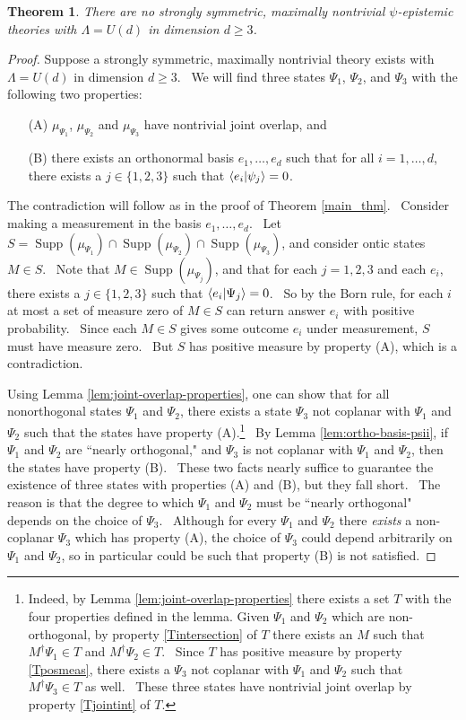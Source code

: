 \documentclass[letterpaper,11pt]{article}
\newtheorem{thm}{Theorem}
\newcommand{\braket}[2]{\mbox{$ \langle #1 | #2 \rangle $}}
\DeclareMathOperator{\supp}{Supp}
\begin{document}
\begin{thm}
\label{main_thm_unitary}
There are no strongly symmetric, maximally nontrivial $\psi$-epistemic theories with $\Lambda= U(d)$ in dimension $d\geq 3$.
\end{thm}
\begin{proof}


Suppose a strongly symmetric, maximally nontrivial theory exists with $\Lambda= U(d)$ in dimension $d\geq 3$. \ We will find three states $\Psi_1$, $\Psi_2$, and $\Psi_3$ with the following two properties:

\begin{enumerate}
\item[(A)] $\mu_{\Psi_1}$, $\mu_{\Psi_2}$ and $\mu_{\Psi_3}$ have nontrivial joint overlap, and
\item[(B)] there exists an orthonormal basis $e_1, \ldots, e_d$ such that for all $i=1,\ldots, d$, there exists a $j \in \{1,2,3\}$ such that $\braket{e_i}{\psi_j}=0$.
\end{enumerate}

The contradiction will follow as in the proof of Theorem \ref{main_thm}. \ Consider making a measurement in the basis $e_1, \ldots, e_d$. \ Let $S=\supp(\mu_{\Psi_1}) \cap \supp(\mu_{\Psi_2}) \cap \supp(\mu_{\Psi_3})$, and consider ontic states $M\in S$. \ Note that $M\in \supp(\mu_{\Psi_j})$, and that for each $j=1,2,3$ and each $e_i$, there exists a $j \in \{1,2,3\}$ such that $\braket{e_i}{\Psi_j}=0$. \ So by the Born rule, for each $i$ at most a set of measure zero of $M\in S$ can return answer $e_i$ with positive probability. \ Since each $M\in S$ gives some outcome $e_i$ under measurement, $S$ must have measure zero. \ But $S$ has positive measure by property (A), which is a contradiction.

Using Lemma \ref{lem:joint-overlap-properties}, one can show that for all nonorthogonal states $\Psi_1$ and $\Psi_2$, there exists a state $\Psi_3$ not coplanar with $\Psi_1$ and $\Psi_2$ such that the states have property (A).\footnote{Indeed, by Lemma \ref{lem:joint-overlap-properties} there exists a set $T$ with the four properties defined in the lemma. Given $\Psi_1$ and $\Psi_2$ which are non-orthogonal, by property \ref{Tintersection} of $T$ there exists an $M$ such that $M^\dagger \Psi_1 \in T$ and $M^\dagger \Psi_2 \in T$. \ Since $T$ has positive measure by property \ref{Tposmeas}, there exists a $\Psi_3$ not coplanar with $\Psi_1$ and $\Psi_2$ such that $M^\dagger \Psi_3 \in T$ as well. \ These three states have nontrivial joint overlap by property \ref{Tjointint} of $T$.} \ By Lemma \ref{lem:ortho-basis-psii}, if $\Psi_1$ and $\Psi_2$ are ``nearly orthogonal," and $\Psi_3$ is not coplanar with $\Psi_1$ and $\Psi_2$, then the states have property (B). \ These two facts nearly suffice to guarantee the existence of three states with properties (A) and (B), but they fall short. \ The reason is that the degree to which $\Psi_1$ and $\Psi_2$ must be ``nearly orthogonal" depends on the choice of $\Psi_3$. \ Although for every $\Psi_1$ and $\Psi_2$ there \emph{exists} a non-coplanar $\Psi_3$ which has property (A), the choice of $\Psi_3$ could depend arbitrarily on $\Psi_1$ and $\Psi_2$, so in particular could be such that property (B) is not satisfied.


\end{proof}
\end{document}
